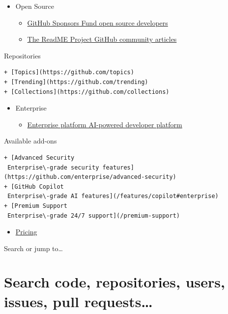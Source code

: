 \documentclass[
  letterpaper,
]{book}
\providecommand{\tightlist}{%
  \setlength{\itemsep}{0pt}\setlength{\parskip}{0pt}}\usepackage{longtable,booktabs,array}
\begin{document}
\begin{itemize}
\item
  Open Source

  \begin{itemize}
  \item
    \href{./sponsors}{GitHub Sponsors Fund open source developers}
  \item
    \href{https://github.com/readme}{The ReadME Project GitHub community
    articles}
  \end{itemize}
\end{itemize}

Repositories

\begin{verbatim}
+ [Topics](https://github.com/topics)
+ [Trending](https://github.com/trending)
+ [Collections](https://github.com/collections)
\end{verbatim}

\begin{itemize}
\item
  Enterprise

  \begin{itemize}
  \tightlist
  \item
    \href{./enterprise}{Enterprise platform AI-powered developer
    platform}
  \end{itemize}
\end{itemize}

Available add-ons

\begin{verbatim}
+ [Advanced Security
 Enterprise\-grade security features](https://github.com/enterprise/advanced-security)
+ [GitHub Copilot
 Enterprise\-grade AI features](/features/copilot#enterprise)
+ [Premium Support
 Enterprise\-grade 24/7 support](/premium-support)
\end{verbatim}

\begin{itemize}
\tightlist
\item
  \href{https://github.com/pricing}{Pricing}
\end{itemize}

Search or jump to\ldots{}


\chapter{Search code, repositories, users, issues, pull
requests\ldots{}}\label{search-code-repositories-users-issues-pull-requests-1}
\end{document}

